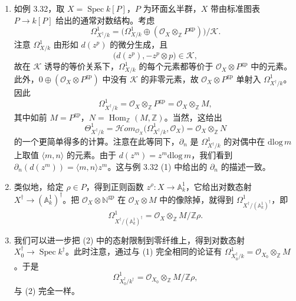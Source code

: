\begin{examples}
\begin{enumerate}[label=(\arabic*),leftmargin=2.2em,itemsep=3pt]
\item 如例 3.32，取 $X=\operatorname{Spec} k[P]$，$P$ 为环面幺半群，$X$ 带由标准图表 $P\to k[P]$ 给出的通常对数结构。考虑
\[
  \Omega^1_{X^{\dagger}/k}
  =\bigl(\Omega^1_{X/k}\oplus(\mathcal{O}_X\otimes_{\mathbb{Z}}P^{\mathrm{gp}})\bigr)\big/\mathcal{K}.
\]
注意 $\Omega^1_{X/k}$ 由形如 $d(z^p)$ 的微分生成，且
\[
  \bigl(d(z^p),-z^p\otimes p\bigr)\in\mathcal{K},
\]
故在 $\mathcal{K}$ 诱导的等价关系下，$\Omega^1_{X/k}$ 的每个元素都等价于 $\mathcal{O}_X\otimes P^{\mathrm{gp}}$ 中的元素。此外，$0\oplus(\mathcal{O}_X\otimes P^{\mathrm{gp}})$ 中没有 $\mathcal{K}$ 的非零元素，故 $\mathcal{O}_X\otimes P^{\mathrm{gp}}$ 单射入 $\Omega^1_{X^{\dagger}/k}$。因此
\[
  \Omega^1_{X^{\dagger}/k}=\mathcal{O}_X\otimes_{\mathbb{Z}}P^{\mathrm{gp}}
  =\mathcal{O}_X\otimes_{\mathbb{Z}}M,
\]
其中如前 $M=P^{\mathrm{gp}}$，$N=\operatorname{Hom}_{\mathbb{Z}}(M,\mathbb{Z})$。当然，这给出
\[
  \Theta^1_{X^{\dagger}/k}
  =\mathcal{H}om_{\mathcal{O}_X}\bigl(\Omega^1_{X^{\dagger}/k},\mathcal{O}_X\bigr)
  =\mathcal{O}_X\otimes_{\mathbb{Z}}N
\]
的一个更简单得多的计算。注意在此等同下，$\partial_n$ 是 $\Omega^1_{X^{\dagger}/k}$ 的对偶中在 $\mathrm{dlog}\,m$ 上取值 $\langle m,n\rangle$ 的元素。由于 $d(z^m)=z^m\mathrm{dlog}\,m$，我们看到 $\partial_n(d(z^m))=\langle m,n\rangle z^m$。这与例 3.32 (1) 中给出的 $\partial_n$ 的描述一致。


\item 类似地，给定 $\rho\in P$，得到正则函数 $z^{\rho}:X\to\mathbb{A}^1_k$，它给出对数态射 $X^{\dagger}\to(\mathbb{A}^1_k)^{\dagger}$。把 $\mathcal{O}_X\otimes\mathbb{N}^{\mathrm{gp}}$ 在 $\mathcal{O}_X\otimes M$ 中的像除掉，就得到 $\Omega^1_{X^{\dagger}/(\mathbb{A}^1_k)^{\dagger}}$，即
\[
  \Omega^1_{X^{\dagger}/(\mathbb{A}^1_k)^{\dagger}}
  =\mathcal{O}_X\otimes_{\mathbb{Z}}M/\mathbb{Z}\rho.
\]
\item 我们可以进一步把 (2) 中的态射限制到零纤维上，得到对数态射 $X_0^{\dagger}\to\operatorname{Spec} k^{\dagger}$。此时注意，通过与 (1) 完全相同的论证有 $\Omega^1_{X_0^{\dagger}/k}=\mathcal{O}_{X_0}\otimes_{\mathbb{Z}}M$。于是
\[
  \Omega^1_{X_0^{\dagger}/k^{\dagger}}
  =\mathcal{O}_{X_0}\otimes_{\mathbb{Z}}M/\mathbb{Z}\rho,
\]
与 (2) 完全一样。


\end{enumerate}
\end{examples}
